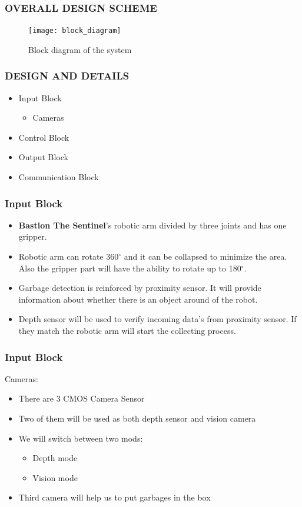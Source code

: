 \documentclass{beamer}
\begin{document}
 \begin{frame}
  \frametitle{OVERALL DESIGN SCHEME}
  \begin{figure}[h]
   \begin{center}
    \texttt{[image: block\_diagram]}
    \caption{Block diagram of the system}
   \end{center}
  \end{figure}
 \end{frame}
 
 \begin{frame}
  \frametitle{DESIGN AND DETAILS}
  \begin{itemize}
   \item Input Block
   \begin{itemize}
    \item Cameras
   \end{itemize}
   \item Control Block
   \item Output Block
   \item Communication Block
  \end{itemize}
 \end{frame}

 \begin{frame}
  \frametitle{Input Block}
  \begin{itemize}
    \item \textbf{Bastion The Sentinel}'s robotic arm divided by three joints and has one gripper.
    \item Robotic arm can rotate 360$^{\circ}$ and it can be collapsed to minimize the area. Also the gripper part will 
    have the ability to rotate up to 180$^{\circ}$.
    \item Garbage detection is reinforced by proximity sensor. It will provide information about whether there is an object around 
    of the robot.
    \item Depth sensor will be used to verify incoming data's from proximity sensor. If they match the robotic arm will start the 
    collecting process.
  \end{itemize}
 \end{frame}
 
  \begin{frame}
  \frametitle{Input Block}
  Cameras:\\
  \bigskip
  \begin{itemize}
    \item There are 3 CMOS Camera Sensor
    \item Two of them will be used as both depth sensor and vision camera
    \item We will switch between two mods:
    \begin{itemize}
     \item Depth mode
     \item Vision mode
    \end{itemize}
    \item Third camera will help us to put garbages in the box
  \end{itemize}
 \end{frame}
 
\end{document}
